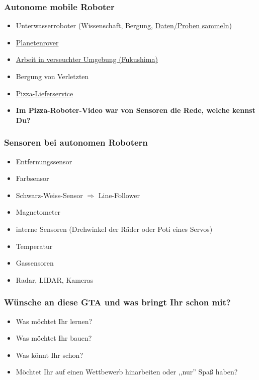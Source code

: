 \documentclass{beamer}
\begin{document}
\begin{frame}
\frametitle{Autonome mobile Roboter}
\begin{itemize}
\item  Unterwasserroboter (Wissenschaft, Bergung, \href{https://youtu.be/dF1Yb3Fa5sE?t=257}{Daten/Proben sammeln}) 
\item  \href{https://www.youtube.com/watch?v=5qqsMjy8Rx0}{Planetenrover}
\item  \href{https://www.youtube.com/watch?v=mhQixNlLF_k}{Arbeit in verseuchter Umgebung (Fukushima)}
\item  Bergung von Verletzten
\item  \href{https://www.youtube.com/watch?v=ujzjZuhE92g}{Pizza-Lieferservice} 
\item \textbf{Im Pizza-Roboter-Video war von Sensoren die Rede, welche kennst Du?}
\end{itemize}
\end{frame}

\begin{frame}
\frametitle{Sensoren bei autonomen Robotern}
\begin{itemize}
\item   Entfernungssensor
\item  Farbsensor
\item   Schwarz-Weiss-Sensor $\Rightarrow$ Line-Follower
\item   Magnetometer
\item  interne Sensoren (Drehwinkel der Räder oder Poti eines Servos)
\item Temperatur
\item Gassensoren
\item Radar, LIDAR, Kameras
\end{itemize}
\end{frame}

\begin{frame}
\frametitle{Wünsche an diese GTA und was bringt Ihr schon mit?}
\begin{itemize}
\item  Was möchtet Ihr lernen?
\item  Was möchtet Ihr bauen?
\item   Was könnt Ihr schon?
\item   Möchtet Ihr auf einen Wettbewerb hinarbeiten oder ,,nur'' Spaß haben?
\end{itemize}
\end{frame}
\end{document}
